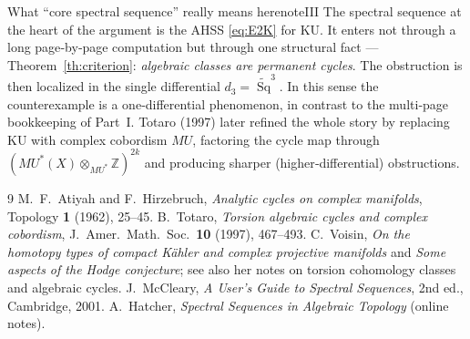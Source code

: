 \documentclass{article}
\newcommand{\Z}{{\mathbb{Z}}}
\DeclareMathOperator{\Sq}{Sq}
\newcommand{\KU}{\mathrm{KU}}
\begin{document}
\begin{titledBox}{What ``core spectral sequence'' really means here}{noteIII}
The spectral sequence at the heart of the argument is the AHSS
\eqref{eq:E2K} for $\KU$. It enters not through a long page‑by‑page computation
but through one structural fact --- Theorem~\ref{th:criterion}: \emph{algebraic
classes are permanent cycles}. The obstruction is then localized in the single
differential $d_3=\widetilde{\Sq}^3$. In this sense the counterexample is a
one‑differential phenomenon, in contrast to the multi‑page bookkeeping of Part~I.
Totaro (1997) later refined the whole story by replacing $\KU$ with complex
cobordism $MU$, factoring the cycle map through $(MU^*(X)\otimes_{MU^*}\Z)^{2k}$
and producing sharper (higher‑differential) obstructions.
\end{titledBox}

\begin{thebibliography}{9}
 M.~F.~Atiyah and F.~Hirzebruch,
\emph{Analytic cycles on complex manifolds}, Topology \textbf{1} (1962), 25--45.
 B.~Totaro,
\emph{Torsion algebraic cycles and complex cobordism},
J.\ Amer.\ Math.\ Soc.\ \textbf{10} (1997), 467--493.
 C.~Voisin,
\emph{On the homotopy types of compact K\"ahler and complex projective manifolds}
and \emph{Some aspects of the Hodge conjecture}; see also her notes on torsion
cohomology classes and algebraic cycles.
 J.~McCleary,
\emph{A User's Guide to Spectral Sequences}, 2nd ed., Cambridge, 2001.
 A.~Hatcher,
\emph{Spectral Sequences in Algebraic Topology} (online notes).
\end{thebibliography}
\end{document}
